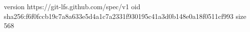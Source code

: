 version https://git-lfs.github.com/spec/v1
oid sha256:f6f0fccb19c7a8a633e5d4a1c7a2331f930195c41a3d0b148e0a18f0511cf993
size 568
